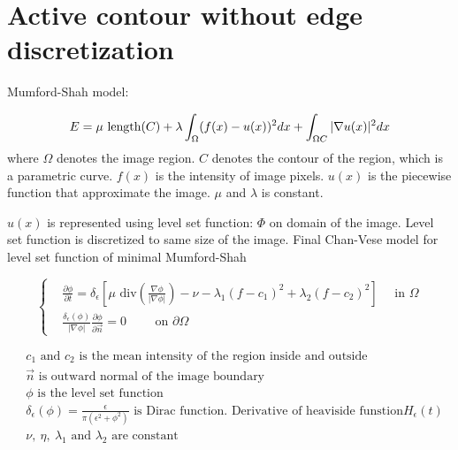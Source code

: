 


\section{Active contour without edge discretization}

Mumford-Shah model:

\begin{equation}
E = \mu \text{ length}(C) 
+ \lambda\int_{\Omega}(f(x) - u(x))^2 dx
+ \int_{\Omega \\ C}|\nabla u(x)|^2 dx
\end{equation}
where $\Omega$ denotes the image region. $C$ denotes the contour of the region, which is a parametric curve. $f(x)$ is the intensity of image pixels. $u(x)$ is the piecewise function that approximate the image. $\mu$ and $\lambda$ is constant.

$u(x)$ is represented using level set function: $\Phi$ on domain of the image. Level set function is discretized to same size of the image. Final Chan-Vese model for level set function of minimal Mumford-Shah

\begin{equation}
    \left\{ 
        \begin{aligned}
        & \frac{\partial \phi}{\partial t} = 
                \delta_{\epsilon} \left[
                \mu \text{ div} \left( \frac{\nabla \phi}{|\nabla \phi|} \right) - 
                \nu - 
                \lambda_1 (f-c_1)^2 +
                \lambda_2 (f-c_2)^2
                \right] \quad \text{ in } \Omega\\
        & \frac{\delta_{\epsilon}(\phi)}{|\nabla \phi|} 
            \frac{\partial \phi}{\partial \overrightarrow{n}}
            = 0
            \qquad \text{ on } \partial \Omega
        \end{aligned}
    \right.
\end{equation}

\begin{equation}
    \begin{aligned}
        &	c_1 \text{ and } c_2 \text{ is the mean intensity of the region inside and outside} \\
        & 	\overrightarrow{n} 
            \text{ is outward normal of the image boundary} \\
        & 	\phi 
            \text{ is the level set function} \\
        & 	\delta_{\epsilon}(\phi) = \frac{\epsilon}{\pi (\epsilon^2 + \phi^2)} 
            \text{ is Dirac function. Derivative of heaviside funstion} H_{\epsilon}(t) \\
        & \nu,\ \eta,\ \lambda_1 \text{ and } \lambda_2 \text{ are constant}
    \end{aligned}
\end{equation}

